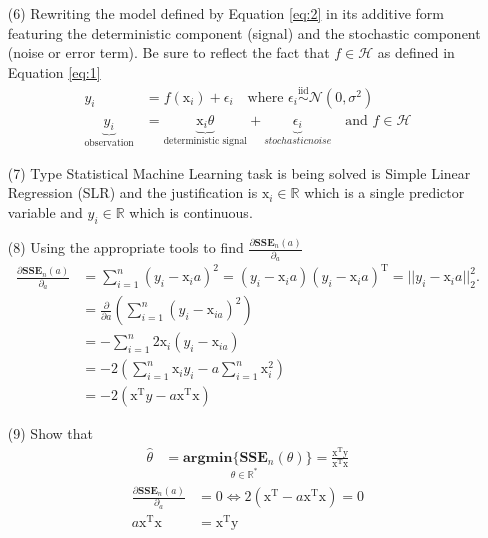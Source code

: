 \documentclass[12pt,a4paper]{article}
\begin{document}
\begin{enumerate}
	\item[(6)] Rewriting the model defined by Equation \eqref{eq:2}  in its additive form featuring the deterministic component (signal) and the stochastic component (noise or error term). Be sure to reflect the fact that $f \in  \mathscr{H} $ as defined in Equation \eqref{eq:1}
	\begin{align*}
			y_i  &=  f(\mathrm{x}_i) + \epsilon_i \quad \text{where } \epsilon_i \overset{\text{iid}} \sim \mathcal{N}(0, \sigma^2)\\
		\underbrace{y_i}_{\text{observation}}  &=  \underbrace{ \mathrm{x}_i\theta }_{\text{deterministic signal}} + \underbrace{ \epsilon_i }_{stochastic noise}  \quad \text{and }  f \in  \mathscr{H}
	\end{align*}
	\item[(7)]  Type Statistical Machine Learning task is being solved  is Simple Linear Regression (SLR) and the justification is $\mathrm{x}_i \in \mathbb{R}$ which is a single predictor variable and $y_i \in \mathbb{R}$ which is continuous.
	\item[(8)] Using the appropriate tools to find $\frac{\partial\textbf{SSE}_n(a)}{\partial_a} $
	\begin{align*}
			\frac{\partial\textbf{SSE}_n(a)}{\partial_a} &=  \sum_{i=1}^n (y_i - \mathrm{x}_i a)^2  =  (y_i - \mathrm{x}_i a)    (y_i - \mathrm{x}_i a) ^ {\text{T}} = || y_i  - \mathrm{x}_i a ||_2^2.\\
			&=  \frac{\partial}{\partial a} (\sum_{i=1}^n (y_i -  \mathrm{x}_{ia} )^2  )\\
			&= -\sum_{i=1}^n 2\mathrm{x}_i (y_i - \mathrm{x}_{ia}) \\
			&= -2 ( \sum_{i=1}^n \mathrm{x}_i y_i  - a \sum_{i =1}^ n \mathrm{x}_i^2 )\\
			&=  -2(\mathrm{x}^{\text{T} }y - a \mathrm{x}^{\text{T} }\mathrm{x} ) 
	\end{align*}
	\item[(9)] Show that  
			\begin{align*}
					\hat{\theta} &=   \underset{\theta \in \mathbb{R}^ {*} } {\mathbf{argmin} \lbrace \textbf{SSE}_n(\theta ) }  \rbrace  =  \frac{\mathrm{x} ^{\text{T} }   \mathrm{y}} { \mathrm{x} ^{\text{T}} \mathrm{x} }
			\end{align*}
			\begin{align*}
					\frac{\partial\textbf{SSE}_n(a)}{\partial_a} &= 0  \iff  2(\mathrm{x}^{\text{T} } - a \mathrm{x}^{\text{T} }\mathrm{x} )  = 0\\
					a \mathrm{x}^{\text{T} }\mathrm{x}  &=  \mathrm{x}^{\text{T} }\mathrm{y}\\

\end{align*}
\end{enumerate}
\end{document}
